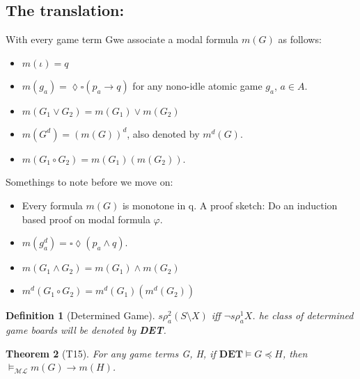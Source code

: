 \documentclass[10pt]{article}
\renewcommand{\phi}{\varphi}
\newcommand{\move}{\lozenge}
\newcommand{\Move}{\square}
\newcommand{\ml}{\mathcal{ML}}
\newcommand{\id}{\iota}
\newcommand{\cle}{\preccurlyeq}
\newtheorem{theorem}{Theorem}
\newtheorem{definition}[theorem]{Definition}
\begin{document}
		\subsection{The translation:}
		With every game term Gwe associate a modal formula $m(G)$ as follows:
		\begin{itemize}
			\item $m(\id) = q$
			\item $m(g_a) = \move\Move(p_a \rightarrow q)$ for any nono-idle atomic game $g_a$, $a\in A$. 
			\item $m(G_1 \lor G_2) = m(G_1)\lor m(G_2)$
			\item $m(G^d) = (m(G))^d$, also denoted by $m^d(G)$.
			\item $m(G_1 \circ G_2) = m(G_1)(m(G_2))$. 
		\end{itemize}
		Somethings to note before we move on:
		\begin{itemize}
			\item Every formula $m(G)$ is  monotone in q. A proof sketch: Do an induction based proof on modal formula $\phi$.
			\item $m(g_a^d) = \Move\move(p_a \land q)$.
			\item $m(G_1 \land G_2) = m(G_1) \land m(G_2)$
			\item $m^d(G_1 \circ G_2) = m^d(G_1)(m^d(G_2))$
		\end{itemize}
		\begin{definition}[Determined Game]
			$s\rho_a^2(S\setminus X)$ iff $\neg s \rho_a^1 X$. he class of determined
			game boards will be denoted by \textbf{DET}.
		\end{definition}
		\begin{theorem}[T15]\label{eq23}
			For any game terms G, H, if $\textbf{DET}\models G \cle H$, then $\models_{\ml} m(G) \rightarrow m(H)$.
		\end{theorem}
\end{document}
